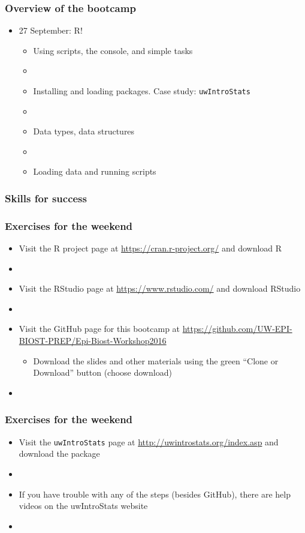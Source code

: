 \documentclass[12pt]{beamer}
\newcommand{\myframe}[1]{\begin{frame} \frametitle{#1}}
\begin{document}
\myframe{Overview of the bootcamp}
\begin{itemize}
\item 27 September: R!
\begin{itemize}
\item Using scripts, the console, and simple tasks
\item[]
\item Installing and loading packages. Case study: \texttt{uwIntroStats}
\item[]
\item Data types, data structures
\item[]
\item Loading data and running scripts
\end{itemize}
\end{itemize}
\end{frame}

\myframe{Skills for success}

\end{frame}

\myframe{Exercises for the weekend}
\begin{itemize}
\item Visit the R project page at \url{https://cran.r-project.org/} and download R
\item[]
\item Visit the RStudio page at \url{https://www.rstudio.com/} and download RStudio
\item[]
\item Visit the GitHub page for this bootcamp at \url{https://github.com/UW-EPI-BIOST-PREP/Epi-Biost-Workshop2016}
\begin{itemize}
\item Download the slides and other materials using the green ``Clone or Download'' button (choose download)
\end{itemize}
\item[]
\end{itemize}
\end{frame}

\myframe{Exercises for the weekend}
\begin{itemize}
\item Visit the \texttt{uwIntroStats} page at \url{http://uwintrostats.org/index.asp} and download the package
\item[]
\item If you have trouble with any of the steps (besides GitHub), there are help videos on the uwIntroStats website
\item[]
\end{itemize}
\end{frame}
\end{document}
